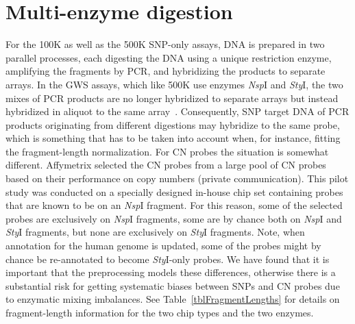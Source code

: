 \documentclass[10pt,a4paper]{article}
\newcommand{\GWSSix}{GWS6\xspace}
\newcommand{\NspI}{\emph{Nsp}I\xspace}
\newcommand{\StyI}{\emph{Sty}I\xspace}
\begin{document}
\clearpage
\section{Multi-enzyme digestion}
\label{secMultiEnzymeDigestion}
For the 100K as well as the 500K SNP-only assays, DNA is prepared in two parallel processes, each digesting the DNA using a unique restriction enzyme, amplifying the fragments by PCR, and hybridizing the products to separate arrays.  In the GWS assays, which like 500K use enzymes \NspI and \StyI, the two mixes of PCR products are no longer hybridized to separate arrays but instead hybridized in aliquot to the same array~\citep{Affymetrix_2007f,Affymetrix_2007g}.
Consequently, SNP target DNA of PCR products originating from different digestions may hybridize to the same probe, which is something that has to be taken into account when, for instance, fitting the fragment-length normalization.
For CN probes the situation is somewhat different.  Affymetrix selected the CN probes from a large pool of CN probes based on their performance on copy numbers (private communication).  This pilot study was conducted on a specially designed in-house chip set containing probes that are known to be on an \NspI fragment.  For this reason, some of the selected probes are exclusively on \NspI fragments, some are by chance both on \NspI and \StyI fragments, but none are exclusively on \StyI fragments.  Note, when annotation for the human genome is updated, some of the probes might by chance be re-annotated to become \StyI-only probes.
We have found that it is important that the preprocessing models these differences, otherwise there is a substantial risk for getting systematic biases between SNPs and CN probes due to enzymatic mixing imbalances.
See Table~\ref{tblFragmentLengths} for details on fragment-length information for the two chip types and the two enzymes.

\end{document}
